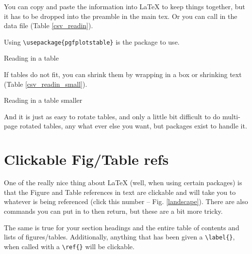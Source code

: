 You can copy and paste the information into \LaTeX{} to keep things together, but it has to be dropped into the preamble in the main tex. Or you can call in the data file (Table \ref{csv_readin}).

Using \verb+\usepackage{pgfplotstable}+ is the package to use.

\begin{table}[h]
\centering
\caption[Normal size table]{Reading in a table}
\label{csv_readin}
\end{table}

If tables do not fit, you can shrink them by wrapping in a box or shrinking text (Table \ref{csv_readin_small}).

\begin{table}[h]
\tiny %
\centering
\caption[Tiny table]{Reading in a table smaller}
\label{csv_readin_small}
\end{table}

And it is just as easy to rotate tables, and only a little bit difficult to do multi-page rotated tables, any what ever else you want, but packages exist to handle it. 

\clearpage %

\section{Clickable Fig/Table refs}

One of the really nice thing about \LaTeX{} (well, when using certain packages) is that the Figure and Table references in text are clickable and will take you to whatever is being referenced (click this number -- Fig. \ref{landscape}). There are also commands you can put in to then return, but these are a bit more tricky. 

The same is true for your section headings and the entire table of contents and lists of figures/tables. Additionally, anything that has been given a \verb+\label{}+, when called with a \verb+\ref{}+ will be clickable. 











